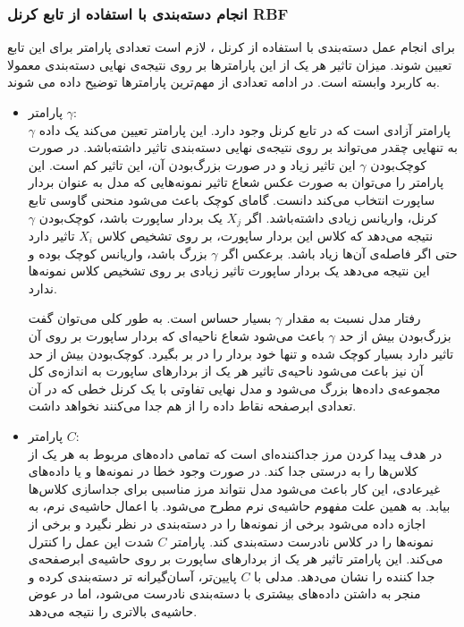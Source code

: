 \subsubsection{ انجام دسته‌بندی  با استفاده از تابع کرنل RBF}
برای انجام عمل دسته‌بندی با استفاده از کرنل ، لازم است تعدادی پارامتر برای این تابع تعیین شوند. میزان تاثیر هر یک از این پارامترها بر روی نتیجه‌ی نهایی دسته‌بندی معمولا به کاربرد وابسته است. در ادامه تعدادی از  مهم‌ترین پارامترها توضیح داده می شوند. 
\begin{itemize}
	\item پارامتر $\gamma$:
	\\
	$\gamma$ پارامتر آزادی است که در تابع کرنل  وجود دارد. این پارامتر تعیین می‌کند یک داده به تنهایی چقدر می‌تواند بر روی نتیجه‌ی نهایی دسته‌بندی تاثیر داشته‌باشد. در صورت کوچک‌بودن $\gamma$ این تاثیر زیاد و در صورت بزرگ‌بودن آن، این تاثیر کم است. این پارامتر را می‌توان به صورت عکس شعاع تاثیر نمونه‌هایی که مدل به عنوان بردار ساپورت انتخاب می‌کند دانست. گامای کوچک باعث می‌شود منحنی گاوسی تابع کرنل، واریانس زیادی داشته‌باشد. اگر $X_j$ یک بردار ساپورت باشد، کوچک‌بودن $\gamma$ نتیجه می‌دهد که کلاس این بردار ساپورت، بر روی تشخیص کلاس $X_i$  تاثیر دارد حتی اگر فاصله‌ی آن‌ها زیاد باشد. برعکس اگر $\gamma$ بزرگ باشد، واریانس کوچک بوده و این نتیجه می‌دهد یک بردار ساپورت تاثیر زیادی بر روی تشخیص کلاس نمونه‌ها ندارد.

رفتار مدل نسبت به مقدار $\gamma$ بسیار حساس است. به طور کلی می‌توان گفت بزرگ‌بودن بیش از حد $\gamma$ باعث می‌شود شعاع ناحیه‌ای که بردار ساپورت بر روی آن تاثیر دارد بسیار کوچک شده و تنها خود بردار را در بر بگیرد. کوچک‌بودن بیش از حد آن نیز باعث می‌شود ناحیه‌ی تاثیر هر یک از بردارهای ساپورت به اندازه‌ی کل مجموعه‌ی داده‌ها بزرگ می‌شود و مدل نهایی تفاوتی با یک کرنل خطی که در آن تعدادی ابرصفحه نقاط داده را از هم جدا می‌کنند نخواهد داشت.

	\item پارامتر $C$:
	\\
	در  هدف پیدا کردن مرز جداکننده‌ای است که تمامی داده‌های مربوط به هر یک از کلاس‌ها را به درستی جدا کند. در صورت وجود خطا در نمونه‌ها و یا داده‌های غیرعادی، این کار باعث می‌شود مدل نتواند مرز مناسبی برای جداسازی کلاس‌ها بیابد. به همین علت مفهوم حاشیه‌ی نرم مطرح می‌شود. با اعمال حاشیه‌ی نرم، به  اجازه داده می‌شود برخی از نمونه‌ها را در دسته‌بندی در نظر نگیرد و برخی از نمونه‌ها را در کلاس نادرست دسته‌بندی کند. پارامتر $C$ شدت این عمل را کنترل می‌کند. این پارامتر تاثیر هر یک از بردارهای ساپورت بر روی حاشیه‌ی ابرصفحه‌ی جدا کننده را نشان می‌دهد. مدلی با $C$ پایین‌تر، آسان‌گیرانه تر دسته‌بندی کرده و منجر به داشتن داده‌های بیشتری با دسته‌بندی نادرست می‌شود، اما در عوض حاشیه‌ی بالاتری را نتیجه می‌دهد. 
\end{itemize} 
 

